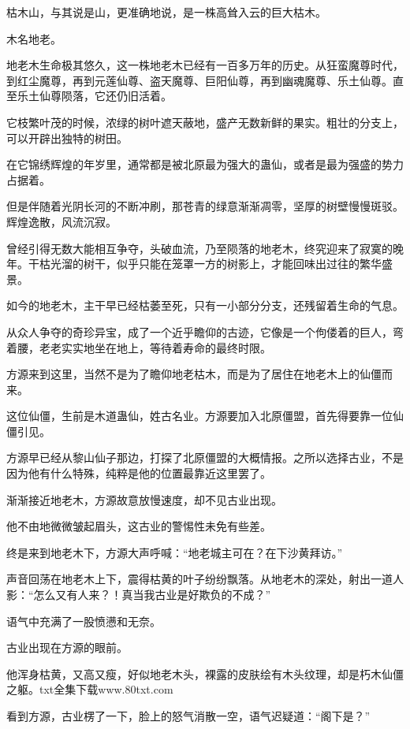 
\begin{this_body}

枯木山，与其说是山，更准确地说，是一株高耸入云的巨大枯木。

木名地老。

地老木生命极其悠久，这一株地老木已经有一百多万年的历史。从狂蛮魔尊时代，到红尘魔尊，再到元莲仙尊、盗天魔尊、巨阳仙尊，再到幽魂魔尊、乐土仙尊。直至乐土仙尊陨落，它还仍旧活着。

它枝繁叶茂的时候，浓绿的树叶遮天蔽地，盛产无数新鲜的果实。粗壮的分支上，可以开辟出独特的树田。

在它锦绣辉煌的年岁里，通常都是被北原最为强大的蛊仙，或者是最为强盛的势力占据着。

但是伴随着光阴长河的不断冲刷，那苍青的绿意渐渐凋零，坚厚的树壁慢慢斑驳。辉煌逸散，风流沉寂。

曾经引得无数大能相互争夺，头破血流，乃至陨落的地老木，终究迎来了寂寞的晚年。干枯光溜的树干，似乎只能在笼罩一方的树影上，才能回味出过往的繁华盛景。

如今的地老木，主干早已经枯萎至死，只有一小部分分支，还残留着生命的气息。

从众人争夺的奇珍异宝，成了一个近乎瞻仰的古迹，它像是一个佝偻着的巨人，弯着腰，老老实实地坐在地上，等待着寿命的最终时限。

方源来到这里，当然不是为了瞻仰地老枯木，而是为了居住在地老木上的仙僵而来。

这位仙僵，生前是木道蛊仙，姓古名业。方源要加入北原僵盟，首先得要靠一位仙僵引见。

方源早已经从黎山仙子那边，打探了北原僵盟的大概情报。之所以选择古业，不是因为他有什么特殊，纯粹是他的位置最靠近这里罢了。

渐渐接近地老木，方源故意放慢速度，却不见古业出现。

他不由地微微皱起眉头，这古业的警惕性未免有些差。

终是来到地老木下，方源大声呼喊：“地老城主可在？在下沙黄拜访。”

声音回荡在地老木上下，震得枯黄的叶子纷纷飘落。从地老木的深处，射出一道人影：“怎么又有人来？！真当我古业是好欺负的不成？”

语气中充满了一股愤懑和无奈。

古业出现在方源的眼前。

他浑身枯黄，又高又瘦，好似地老木头，裸露的皮肤绘有木头纹理，却是朽木仙僵之躯。txt全集下载www.80txt.com

看到方源，古业楞了一下，脸上的怒气消散一空，语气迟疑道：“阁下是？”


\end{this_body}
